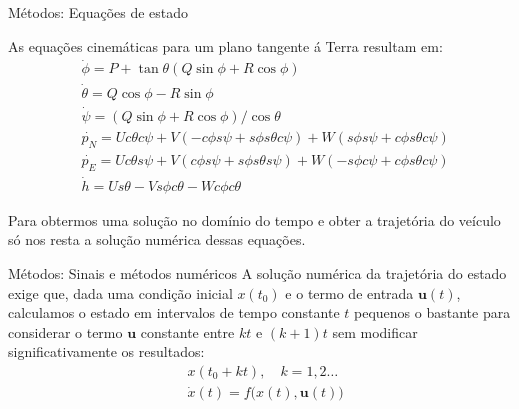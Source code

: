 \documentclass{beamer}
\begin{document}
\begin{frame}{Métodos: Equações de estado}

As equações cinemáticas para um plano tangente á Terra resultam em:
\begin{align*}
    &\dot{\phi}   =  P + \tan{\theta} \left( Q \sin{\phi} + R \cos{\phi} \right) \\
    &\dot{\theta} =  Q \cos{\phi} - R \sin{\phi} \\
    &\dot{\psi}   =  \left( Q \sin{\phi} + R \cos{\phi} \right) / \cos{\theta} \\
    &\dot{p_{N}}  =  U c \theta c \psi  + V ( -c \phi s \psi + s \phi s \theta c \psi ) + W ( s \phi s \psi + c \phi s \theta c \psi) \\
    &\dot{p_{E}}  =  U c \theta s \psi  + V (  c \phi s \psi + s \phi s \theta s \psi ) + W (-s \phi c \psi + c \phi s \theta c \psi) \\
    &\dot{h}      =  U s \theta - V s \phi c \theta - W c \phi c \theta
\end{align*}

Para obtermos uma solução no domínio do tempo e obter a trajetória do veículo só nos resta a solução numérica dessas equações.

\end{frame}

\begin{frame}{Métodos: Sinais e métodos numéricos}
A solução numérica da trajetória do estado exige que, dada uma condição inicial \(x\left(t_{0}\right)\) e o termo de entrada \(\mathbf{u}(t)\), calculamos o estado em intervalos de tempo constante \(t\) pequenos o bastante para considerar o termo \(\mathbf{u}\) constante entre \(kt\) e \(\left(k+1\right)t\) sem modificar significativamente os resultados:
\begin{align*}
    &x \left( t_{0} + kt \right), \quad k = 1,2 \ldots \\
    &\dot{x} \left( t \right) = f \big(x\left(t\right), \mathbf{u}\left(t\right)\big)\label{eq:3.4-1b}
\end{align*}
\end{frame}
\end{document}
